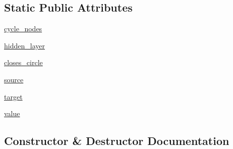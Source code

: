 \subsection*{Static Public Attributes}
\begin{DoxyCompactItemize}
\item 
\hyperlink{classNEAT__PyGenetics_1_1NEAT_1_1GenomeStructures_1_1SimulationStructure_1_1SimulationGenome_1_1SimulationGenome_aa650dc24f64c63322197e5eabd879453}{cycle\+\_\+nodes}
\item 
\hyperlink{classNEAT__PyGenetics_1_1NEAT_1_1GenomeStructures_1_1SimulationStructure_1_1SimulationGenome_1_1SimulationGenome_a66d27e8ed15eb8473d63728d6fa046fe}{hidden\+\_\+layer}
\item 
\hyperlink{classNEAT__PyGenetics_1_1NEAT_1_1GenomeStructures_1_1SimulationStructure_1_1SimulationGenome_1_1SimulationGenome_a246a2949988d817f3ba2e5a27ce0cb26}{closes\+\_\+circle}
\item 
\hyperlink{classNEAT__PyGenetics_1_1NEAT_1_1GenomeStructures_1_1SimulationStructure_1_1SimulationGenome_1_1SimulationGenome_ac4b5b345246df8c26156052e19d88dc3}{source}
\item 
\hyperlink{classNEAT__PyGenetics_1_1NEAT_1_1GenomeStructures_1_1SimulationStructure_1_1SimulationGenome_1_1SimulationGenome_ac175e1e9455296d28d7486373e2546c7}{target}
\item 
\hyperlink{classNEAT__PyGenetics_1_1NEAT_1_1GenomeStructures_1_1SimulationStructure_1_1SimulationGenome_1_1SimulationGenome_a27b218236fdf7a6526bdddef382a38e9}{value}
\end{DoxyCompactItemize}


\subsection{Constructor \& Destructor Documentation}
